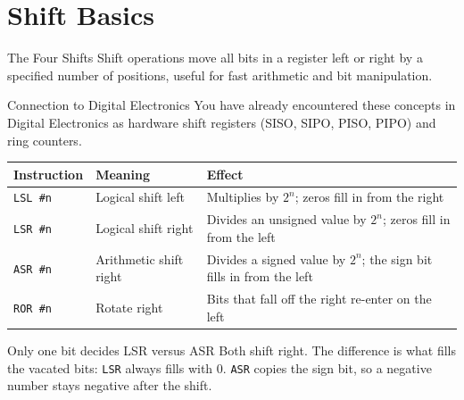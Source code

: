\documentclass[9pt,aspectratio=169,xcolor=table]{beamer}
\begin{document}
\section{Shift Basics}

\begin{frame}{The Four Shifts}
	\leavevmode
	{\small Shift operations move all bits in a register left or right by a specified number of positions, useful for fast arithmetic and bit manipulation.}

	\vspace{0.5mm}
	\begin{block}{Connection to Digital Electronics}
		{\small You have already encountered these concepts in Digital Electronics as hardware shift registers (SISO, SIPO, PISO, PIPO) and ring counters.}
	\end{block}

	\vspace{0.5mm}
	\begin{center}
		{\small
			\striped
			\begin{tabular}{@{}l l R{.6\textwidth}@{}}
				\toprule
				\textbf{Instruction} & \textbf{Meaning} & \textbf{Effect} \\
				\midrule
				\texttt{LSL \#n} & Logical shift left   & Multiplies by $2^n$; zeros fill in from the right \\
				\texttt{LSR \#n} & Logical shift right  & Divides an \alert{unsigned} value by $2^n$; zeros fill in from the left \\
				\texttt{ASR \#n} & Arithmetic shift right & Divides a \alert{signed} value by $2^n$; the sign bit fills in from the left \\
				\texttt{ROR \#n} & Rotate right        & Bits that fall off the right re-enter on the left \\
				\bottomrule
		\end{tabular}}
	\end{center}

	\vspace{0.5mm}
	\begin{block}{Only one bit decides LSR versus ASR}
		{\small Both shift right. The difference is what fills the vacated
			bits: \texttt{LSR} always fills with \alert{0}. \texttt{ASR}
			copies the \alert{sign bit}, so a negative number stays
			negative after the shift.}
	\end{block}
\end{frame}
\end{document}
